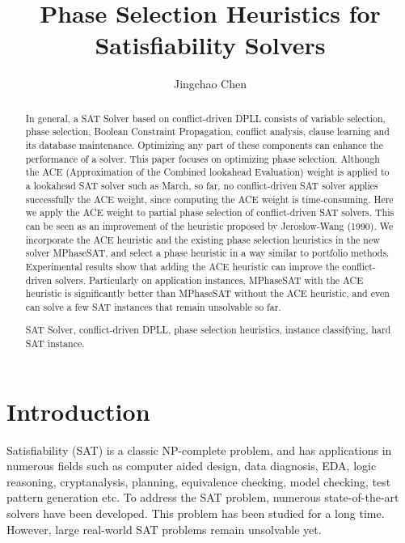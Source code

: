\documentclass{llncs}
\newcommand{\keywords}[1]{\par\addvspace\baselineskip
\noindent\keywordname\enspace\ignorespaces#1}
\begin{document}
\title{Phase Selection Heuristics for Satisfiability Solvers}

\author{Jingchao Chen}

\maketitle
\begin{abstract}
In general, a SAT Solver based on conflict-driven DPLL consists of
variable selection, phase selection, Boolean Constraint Propagation,
conflict analysis, clause learning and its database maintenance.
Optimizing any part of these components can enhance the performance
of a solver. This paper focuses on optimizing phase selection.
Although the ACE (Approximation of the Combined lookahead
Evaluation) weight is applied to a lookahead SAT solver such as
March, so far, no conflict-driven SAT solver applies successfully
the ACE weight, since computing the ACE weight is time-consuming.
Here we apply the ACE weight to partial phase selection of
conflict-driven SAT solvers. This can be seen as an improvement of
the heuristic proposed by Jeroslow-Wang (1990). We incorporate the
ACE heuristic and the existing phase selection heuristics in the new
solver MPhaseSAT, and select a phase heuristic in a way similar to
portfolio methods. Experimental results show that adding the ACE
heuristic can improve the conflict-driven solvers. Particularly on
application instances, MPhaseSAT with the ACE heuristic is
significantly better than MPhaseSAT without the ACE heuristic, and
even can solve a few SAT instances that remain unsolvable so far.

\keywords{SAT Solver, conflict-driven DPLL, phase selection
heuristics, instance classifying, hard SAT instance.}
\end{abstract}

\section{Introduction}
Satisfiability (SAT) is a classic NP-complete problem, and has
applications in numerous fields such as computer aided design, data
diagnosis, EDA, logic reasoning, cryptanalysis, planning,
equivalence checking, model checking, test pattern generation etc.
To address the SAT problem, numerous state-of-the-art solvers have
been developed. This problem has been studied for a long time.
However, large real-world SAT problems remain unsolvable yet.
\end{document}
